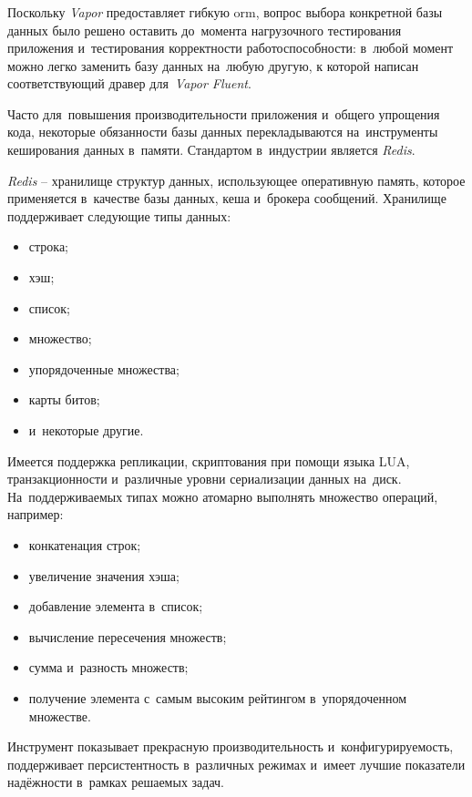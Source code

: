 \subsubsection{}
\label{sec:development:arch:pp:redis}

Поскольку \textit{Vapor} предоставляет гибкую \gls{orm}, вопрос выбора конкретной базы данных было решено оставить до~момента нагрузочного тестирования приложения и~тестирования корректности работоспособности: в~любой момент можно легко заменить базу данных на~любую другую, к которой написан соответствующий дравер для~\textit{Vapor Fluent}.

Часто для~повышения производительности приложения и~общего упрощения кода, некоторые обязанности базы данных перекладываются на~инструменты кеширования данных в~памяти. Стандартом в~индустрии является \textit{Redis}.

\textit{Redis} -- хранилище структур данных, использующее оперативную память, которое применяется в~качестве базы данных, кеша и~брокера сообщений. Хранилище поддерживает следующие типы данных:

\begin{itemize}
	\item строка;
	\item хэш;
	\item список;
	\item множество;
	\item упорядоченные множества;
	\item карты битов;
	\item и~некоторые другие.
\end{itemize}

Имеется поддержка репликации, скриптования при помощи языка LUA, транзакционности и~различные уровни сериализации данных на~диск. На~поддерживаемых типах можно атомарно выполнять множество операций, например:

\begin{itemize}
	\item конкатенация строк;
	\item увеличение значения хэша;
	\item добавление элемента в~список;
	\item вычисление пересечения множеств;
	\item сумма и~разность множеств;
	\item получение элемента с~самым высоким рейтингом в~упорядоченном множестве.
\end{itemize}

Инструмент показывает прекрасную производительность и~конфигурируемость, поддерживает персистентность в~различных режимах и~имеет лучшие показатели надёжности в~рамках решаемых задач.